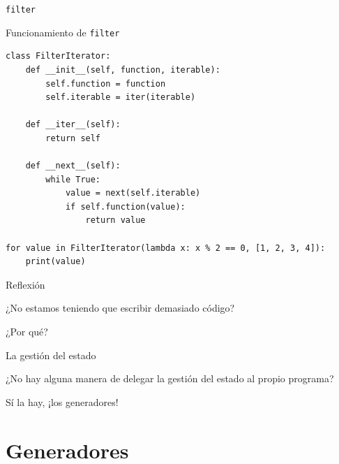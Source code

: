 \documentclass[12pt]{beamer}
\begin{document}
\begin{frame}[fragile]{\texttt{filter}}
\begin{block}{Funcionamiento de \texttt{filter}}
\begin{verbatim}
class FilterIterator:
    def __init__(self, function, iterable):
        self.function = function
        self.iterable = iter(iterable)

    def __iter__(self):
        return self

    def __next__(self):
        while True:
            value = next(self.iterable)
            if self.function(value):
                return value

for value in FilterIterator(lambda x: x % 2 == 0, [1, 2, 3, 4]):
    print(value)
\end{verbatim}
\end{block}  
\end{frame}

\begin{frame}{Reflexión}
    \begin{center}
        ¿No estamos teniendo que escribir demasiado código?
    \end{center}
    \begin{center}
        ¿Por qué?
    \end{center}
\end{frame}

\begin{frame}{La gestión del estado}
    \begin{center}
        ¿No hay alguna manera de delegar la gestión del estado al propio programa?
    \end{center}
    \begin{center}
        Sí la hay, ¡los generadores!
    \end{center}
\end{frame}

\section{Generadores}
\end{document}
